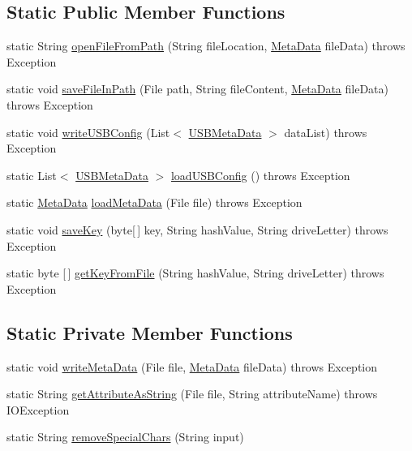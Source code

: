 \subsection*{Static Public Member Functions}
\begin{DoxyCompactItemize}
\item 
static String \mbox{\hyperlink{classpersistence_1_1_file_manager_adfbb7817aa088a174d2a78be57462e71}{open\+File\+From\+Path}} (String file\+Location, \mbox{\hyperlink{classpersistence_1_1_meta_data}{Meta\+Data}} file\+Data)  throws Exception 	
\item 
static void \mbox{\hyperlink{classpersistence_1_1_file_manager_a0630ee2ca01aad2ec24cff07a764bbd2}{save\+File\+In\+Path}} (File path, String file\+Content, \mbox{\hyperlink{classpersistence_1_1_meta_data}{Meta\+Data}} file\+Data)  throws Exception 	
\item 
static void \mbox{\hyperlink{classpersistence_1_1_file_manager_a0d94f3c5d697af23544d161541eaed0f}{write\+U\+S\+B\+Config}} (List$<$ \mbox{\hyperlink{classpersistence_1_1_u_s_b_meta_data}{U\+S\+B\+Meta\+Data}} $>$ data\+List)  throws Exception 	
\item 
static List$<$ \mbox{\hyperlink{classpersistence_1_1_u_s_b_meta_data}{U\+S\+B\+Meta\+Data}} $>$ \mbox{\hyperlink{classpersistence_1_1_file_manager_a5cc9f22a6f81dbba2ff9cbffd9e0c250}{load\+U\+S\+B\+Config}} ()  throws Exception 	
\item 
static \mbox{\hyperlink{classpersistence_1_1_meta_data}{Meta\+Data}} \mbox{\hyperlink{classpersistence_1_1_file_manager_a4600d8fe734a758688b9b41688862aac}{load\+Meta\+Data}} (File file)  throws Exception 	
\item 
static void \mbox{\hyperlink{classpersistence_1_1_file_manager_a2cdbe54741a0a0af658787da34923a5e}{save\+Key}} (byte\mbox{[}$\,$\mbox{]} key, String hash\+Value, String drive\+Letter)  throws Exception 	
\item 
static byte \mbox{[}$\,$\mbox{]} \mbox{\hyperlink{classpersistence_1_1_file_manager_adcb4a47e8759e6fa7560fd5c98d26be9}{get\+Key\+From\+File}} (String hash\+Value, String drive\+Letter)  throws Exception 	
\end{DoxyCompactItemize}
\subsection*{Static Private Member Functions}
\begin{DoxyCompactItemize}
\item 
static void \mbox{\hyperlink{classpersistence_1_1_file_manager_a3e1b3600f691fcc13014ad944b8c1a0d}{write\+Meta\+Data}} (File file, \mbox{\hyperlink{classpersistence_1_1_meta_data}{Meta\+Data}} file\+Data)  throws Exception 	
\item 
static String \mbox{\hyperlink{classpersistence_1_1_file_manager_a2cb506a3762432736083455b762e840b}{get\+Attribute\+As\+String}} (File file, String attribute\+Name)  throws I\+O\+Exception 	
\item 
static String \mbox{\hyperlink{classpersistence_1_1_file_manager_ab4359d704a98bbf6635b9027c3d137ca}{remove\+Special\+Chars}} (String input)
\end{DoxyCompactItemize}
